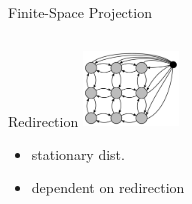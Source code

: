 \documentclass[10pt]{beamer}
\begin{document}
\begin{frame}{Finite-Space Projection}
\begin{columns}
\begin{column}{.30\textwidth}
\begin{block}{Redirection}
                \includegraphics[height=2cm]{../gfx/state_space_reentry.pdf}
                {\small
                \begin{itemize}
                    \item stationary dist.
                    \item dependent on redirection
                \end{itemize}
                }
            \end{block}
        \end{column}
    \end{columns}
\end{frame}
\end{document}
